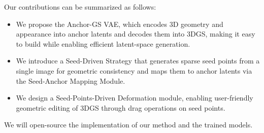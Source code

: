 Our contributions can be summarized as follows:  
\begin{itemize}

    \item We propose the Anchor-GS VAE, which encodes 3D geometry and appearance into anchor latents and decodes them into 3DGS, making it easy to build while enabling efficient latent-space generation. 
    \item We introduce a Seed-Driven Strategy that generates sparse seed points from a single image for geometric consistency and maps them to anchor latents via the Seed-Anchor Mapping Module. 
    \item We design a Seed-Points-Driven Deformation module, enabling user-friendly geometric editing of 3DGS through drag operations on seed points. 
\end{itemize}
We will open-source the implementation of our method and the trained models.






